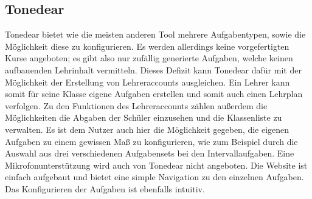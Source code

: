 \subsection*{Tonedear}
\label{sec:Tonedear}
Tonedear bietet wie die meisten anderen Tool mehrere Aufgabentypen, sowie die Möglichkeit diese zu konfigurieren. Es werden allerdings keine vorgefertigten Kurse angeboten; es gibt also nur zufällig generierte Aufgaben, welche keinen aufbauenden Lehrinhalt vermitteln. Dieses Defizit kann Tonedear dafür mit der Möglichkeit der Erstellung von Lehreraccounts ausgleichen. Ein Lehrer kann somit für seine Klasse eigene Aufgaben erstellen und somit auch einen Lehrplan verfolgen. Zu den Funktionen des Lehreraccounts zählen außerdem die Möglichkeiten die Abgaben der Schüler einzusehen und die Klassenliste zu verwalten. Es ist dem Nutzer auch hier die Möglichkeit gegeben, die eigenen Aufgaben
zu einem gewissen Maß zu konfigurieren, wie zum Beispiel durch die Auswahl aus drei verschiedenen Aufgabensets bei den Intervallaufgaben. Eine Mikrofonunterstützung wird auch von Tonedear nicht angeboten. Die Website ist einfach aufgebaut und bietet eine simple Navigation zu den einzelnen Aufgaben. 
Das Konfigurieren der Aufgaben ist ebenfalls intuitiv. \cite{tonedear}


